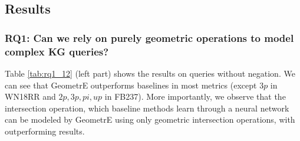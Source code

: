 \documentclass[runningheads]{llncs}
\newcommand{\method}{GeometrE}
\renewcommand{\paragraph}[1]{\subsubsection{#1}}
\begin{document}
\subsection{Results}

\paragraph{RQ1: Can we rely on purely geometric operations to model
  complex KG queries?}

Table \ref{tab:rq1_12} (left part) shows the results on queries
without negation. We can see that \method{} outperforms baselines
in most metrics (except $3p$ in WN18RR and $2p,3p,pi,up$ in
FB237). More importantly, we observe that the intersection operation,
which baseline methods learn through a neural network
can be modeled by \method{} using only geometric intersection
operations, with outperforming results.
\end{document}
